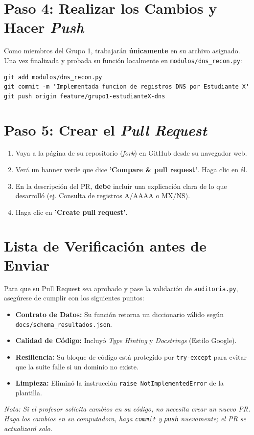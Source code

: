 \documentclass[12pt,a4paper]{article}
\begin{document}
\section{Paso 4: Realizar los Cambios y Hacer \textit{Push}}
Como miembros del Grupo 1, trabajarán \textbf{únicamente} en su archivo asignado.
Una vez finalizada y probada su función localmente en \texttt{modulos/dns\_recon.py}:
\begin{verbatim}
git add modulos/dns_recon.py
git commit -m 'Implementada funcion de registros DNS por Estudiante X'
git push origin feature/grupo1-estudianteX-dns
\end{verbatim}

\section{Paso 5: Crear el \textit{Pull Request}}
\begin{enumerate}
    \item Vaya a la página de su repositorio (\textit{fork}) en GitHub desde su navegador web.
    \item Verá un banner verde que dice \textbf{'Compare \& pull request'}. Haga clic en él.
    \item En la descripción del PR, \textbf{debe} incluir una explicación clara de lo que desarrolló (ej. Consulta de registros A/AAAA o MX/NS).
    \item Haga clic en \textbf{'Create pull request'}.
\end{enumerate}

\section*{Lista de Verificación antes de Enviar}
Para que su Pull Request sea aprobado y pase la validación de \texttt{auditoria.py}, asegúrese de cumplir con los siguientes puntos:
\begin{itemize}
    \item[\checkmark] \textbf{Contrato de Datos:} Su función retorna un diccionario válido según \texttt{docs/schema\_resultados.json}.
    \item[\checkmark] \textbf{Calidad de Código:} Incluyó \textit{Type Hinting} y \textit{Docstrings} (Estilo Google).
    \item[\checkmark] \textbf{Resiliencia:} Su bloque de código está protegido por \texttt{try-except} para evitar que la suite falle si un dominio no existe.
    \item[\checkmark] \textbf{Limpieza:} Eliminó la instrucción \texttt{raise NotImplementedError} de la plantilla.
\end{itemize}

\vspace{0.5cm}
\noindent \textit{Nota: Si el profesor solicita cambios en su código, no necesita crear un nuevo PR. Haga los cambios en su computadora, haga \texttt{commit} y \texttt{push} nuevamente; el PR se actualizará solo.}
\end{document}
